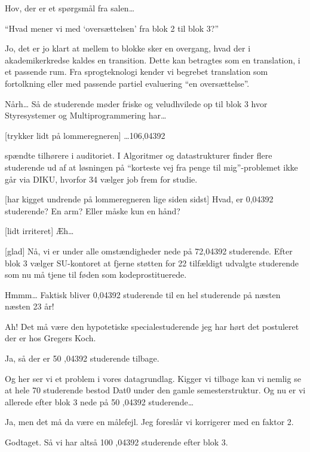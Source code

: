 \documentclass[a4paper,11pt]{article}
\begin{document}
\begin{sketch}
 Hov, der er et spørgsmål fra salen\ldots


 ``Hvad mener vi med `oversættelsen' fra blok 2 til blok 3?''

 Jo, det er jo klart at mellem to blokke sker en overgang, hvad der i akademikerkredse kaldes en transition. Dette kan betragtes som en translation, i et passende rum. Fra sprogteknologi kender vi begrebet translation som fortolkning eller med passende partiel evaluering ``en oversættelse''.

 Nårh\ldots{} Så de studerende møder friske og veludhvilede op til blok 3 hvor Styresystemer og Multiprogrammering har\ldots

[trykker lidt på lommeregneren] \ldots 106,04392

 spændte tilhørere i auditoriet. I Algoritmer og datastrukturer finder flere studerende ud af at løsningen på ``korteste vej fra penge til mig''-problemet ikke går via DIKU, hvorfor 34 vælger job frem for studie.

[har kigget undrende på lommeregneren lige siden sidst] Hvad, er 0,04392 studerende? En arm? Eller måske kun en hånd?

[lidt irriteret] Æh\ldots{}

[glad] Nå, vi er under alle omstændigheder nede på 72,04392 studerende. Efter blok 3 vælger SU-kontoret at fjerne støtten for 22 tilfældigt udvalgte studerende som nu må tjene til føden som kodeprostituerede.

 Hmmm\ldots{} Faktisk bliver 0,04392 studerende til en hel studerende på næsten  næsten 23 år!

 Ah! Det må være den hypotetiske specialestuderende jeg har hørt det postuleret der er hos Gregers Koch.

 Ja, så der er  50  ,04392  studerende tilbage.

 Og her ser vi et problem i vores datagrundlag. Kigger vi
tilbage kan vi nemlig se at hele 70 studerende bestod Dat0 under den
gamle semesterstruktur. Og nu er vi allerede efter blok 3 nede på 50  ,04392  studerende\ldots

 Ja, men det må da være en målefejl. Jeg foreslår vi korrigerer med en faktor 2.

 Godtaget. Så vi har altså 100  ,04392  studerende efter blok 3.


\end{sketch}
\end{document}
